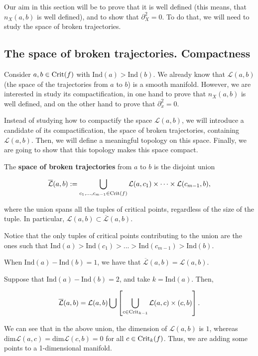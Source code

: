 Our aim in this section will be to prove that it is well defined (this means, that $n_X(a,b)$ is well defined), and to show that $\partial_X^2 = 0$. To do that, we will need to study the space of broken trajectories.

\subsection{The space of broken trajectories. Compactness}

Consider $a, b \in \text{Crit}(f)$ with $\text{Ind}(a) > \text{Ind}(b)$. We already know that $\mathcal{L}(a,b)$ (the space of the trajectories from $a$ to $b$) is a smooth manifold. However, we are interested in study its compactification, in one hand to prove that $n_X(a,b)$ is well defined, and on the other hand to prove that $\partial_x^2 = 0$.

Instead of studying how to compactify the space $\mathcal{L}(a,b)$, we will introduce a candidate of its compactification, the space of broken trajectories, containing $\mathcal{L}(a,b)$. Then, we will define a meaningful topology on this space. Finally, we are going to show that this topology makes this space compact.

\begin{deff}
The {\bf space of broken trajectories} from $a$ to $b$ is the disjoint union

$$\overline{\mathcal{L}}(a,b) := \bigcup_{c_1,...,c_{m-1} \in \text{Crit}(f)} \mathcal{L}(a,c_1) \times \cdots \times \mathcal{L}(c_{m-1},b) ,$$

where the union spans all the tuples of critical points, regardless of the size of the tuple. In particular, $\mathcal{L}(a,b) \subset \overline{\mathcal{L}}(a,b)$.

Notice that the only tuples of critical points contributing to the union are the ones such that $\text{Ind}(a) > \text{Ind}(c_1) > ... > \text{Ind}(c_{m-1}) > \text{Ind}(b)$.
\end{deff}

\begin{rmrk}
When $\text{Ind}(a) - \text{Ind}(b) = 1$, we have that $\overline{\mathcal{L}}(a,b) = \mathcal{L}(a,b)$.
\end{rmrk}

\begin{rmrk}
Suppose that $\text{Ind}(a) - \text{Ind}(b) = 2$, and take $k = \text{Ind}(a)$. Then,

$$\overline{\mathcal{L}}(a,b) = \mathcal{L}(a,b) \bigcup \left[ \bigcup_{c \in \text{Crit}_{k-1}} \mathcal{L}(a,c) \times \mathcal(c,b) \right] .$$

We can see that in the above union, the dimension of $\mathcal{L}(a,b)$ is $1$, whereas $\text{dim} \mathcal{L}(a,c) = \text{dim} \mathcal{L}(c,b) = 0$ for all $c \in \text{Crit}_k(f)$. Thus, we are adding some points to a 1-dimensional manifold.
\end{rmrk}

